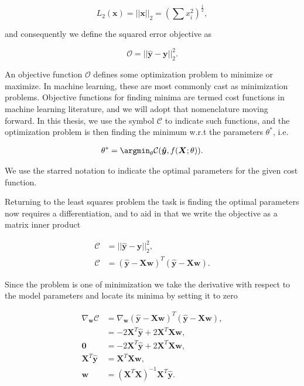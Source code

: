 $$L_2(\boldsymbol{x}) =||\boldsymbol{x}||_2 = \left(\sum x_i^2\right)^{\frac{1}{2}},$$

\noindent and consequently we define the squared error objective as

\begin{equation}
\mathcal{O} = || \boldsymbol{\hat{y}} - \boldsymbol{y} ||_2 ^2.
\end{equation}

\noindent An objective function $\mathcal{O}$ defines some optimization problem to minimize or maximize. In machine learning, these are most commonly cast as minimization problems. Objective functions for finding minima are termed cost functions in machine learning literature, and we will adopt that nomenclature moving forward. In this thesis, we use the symbol $\mathcal{C}$ to indicate such functions, and the optimization problem is then finding the minimum w.r.t the parameters $\theta^*$, i.e. 

\begin{align}\label{eq:cost}
\theta^* = \argmin_\theta \mathcal{C}(\boldsymbol{\hat{y}}, f(\boldsymbol{X}; \theta)).
\end{align}

\noindent We use the starred notation to indicate the optimal parameters for the given cost function.

Returning to the least squares problem the task is finding the optimal parameters now requires a differentiation, and to aid in that we write the objective as a matrix inner product 

\begin{align*}
\mathcal{C} &= || \boldsymbol{\hat{y}} - \boldsymbol{y} ||_2 ^2, \\
\mathcal{C} &= ( \boldsymbol{\hat{y}} - \boldsymbol{Xw})^T( \boldsymbol{\hat{y}} - \boldsymbol{Xw}).
\end{align*}

\noindent Since the problem is one of minimization we take the derivative with respect to the model parameters and locate its minima by setting it to zero 

\begin{align}
\nabla _{\boldsymbol{w}}\mathcal{C} &= \nabla _{\boldsymbol{w}} ( \boldsymbol{\hat{y}} - \boldsymbol{Xw})^T( \boldsymbol{\hat{y}} - \boldsymbol{Xw}), \\
&= -2\boldsymbol{X}^T\boldsymbol{\hat{y}} + 2\boldsymbol{X}^T\boldsymbol{X}\boldsymbol{w}, \\
\boldsymbol{0} &= -2\boldsymbol{X}^T\boldsymbol{\hat{y}} + 2\boldsymbol{X}^T\boldsymbol{X}\boldsymbol{w}, \\
\boldsymbol{X}^T\boldsymbol{\hat{y}} &= \boldsymbol{X}^T\boldsymbol{X}\boldsymbol{w}, \\
\boldsymbol{w} &=(\boldsymbol{X}^T\boldsymbol{X})^{-1} \boldsymbol{X}^T\boldsymbol{\hat{y}}. \label{eq:least_squares}
\end{align}

